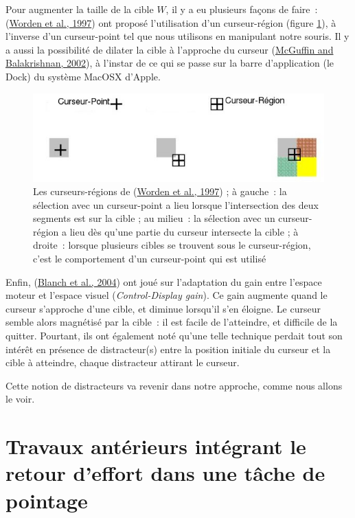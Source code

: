 \documentclass[
]{book}
\begin{document}
Pour augmenter la taille de la cible \(W\), il y a
eu plusieurs façons de faire~: (\protect\hyperlink{ref-worden1997making}{Worden et al., 1997}) ont proposé l'utilisation
d'un curseur-région (figure \ref{fig:areacursor}), à l'inverse
d'un curseur-point tel que nous utilisons en manipulant notre souris. Il y a
aussi la possibilité de dilater la cible à l'approche du curseur
(\protect\hyperlink{ref-mcguffin2002acquisition}{McGuffin and Balakrishnan, 2002}), à l'instar de ce qui se passe sur la barre
d'application (le Dock) du système MacOSX d'Apple.

\begin{figure}
\centering
\includegraphics{img/areaCursor.jpg}
\caption{\label{fig:areacursor}Les curseurs-régions de (\protect\hyperlink{ref-worden1997making}{Worden et al., 1997}) ; à gauche~:
la sélection avec un curseur-point a lieu lorsque l'intersection des
deux segments est sur la cible ; au milieu~: la sélection avec un
curseur-région a lieu dès qu'une partie du curseur intersecte la
cible ; à droite~: lorsque plusieurs cibles se trouvent sous le
curseur-région, c'est le comportement d'un curseur-point qui est
utilisé}
\end{figure}

Enfin, (\protect\hyperlink{ref-blanch2004semantic}{Blanch et al., 2004}) ont
joué sur l'adaptation du gain entre l'espace moteur et l'espace visuel
(\emph{Control-Display gain}). Ce gain augmente quand le curseur s'approche
d'une cible, et diminue lorsqu'il s'en éloigne. Le curseur semble alors
magnétisé par la cible~: il est facile de l'atteindre, et difficile de la
quitter. Pourtant, ils ont également noté qu'une telle technique perdait tout
son intérêt en présence de distracteur(s) entre la position initiale du
curseur et la cible à atteindre, chaque distracteur attirant le curseur.

Cette notion de distracteurs va revenir dans notre approche, comme nous
allons le voir.

\hypertarget{travaux-antuxe9rieurs-intuxe9grant-le-retour-deffort-dans-une-tuxe2che-de-pointage}{%
\section{Travaux antérieurs intégrant le retour d'effort dans une tâche de pointage}\label{travaux-antuxe9rieurs-intuxe9grant-le-retour-deffort-dans-une-tuxe2che-de-pointage}}
\end{document}
